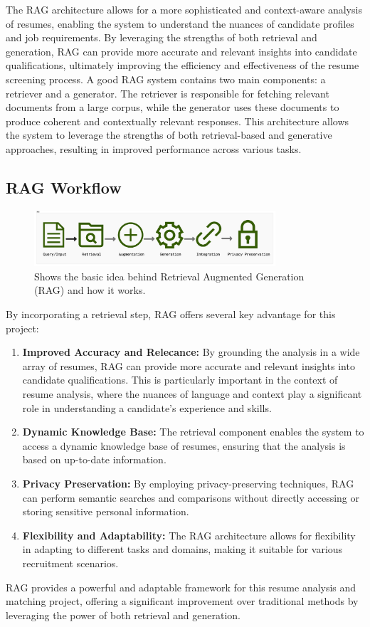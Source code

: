 \documentclass[12pt]{report}
\begin{document}
The RAG architecture allows for a more sophisticated and context-aware analysis of resumes, enabling the system to understand the nuances of candidate profiles and job requirements. By leveraging the strengths of both retrieval and generation, RAG can provide more accurate and relevant insights into candidate qualifications, ultimately improving the efficiency and effectiveness of the resume screening process. A good RAG system contains two main components: a retriever and a generator. The retriever is responsible for fetching relevant documents from a large corpus, while the generator uses these documents to produce coherent and contextually relevant responses. This architecture allows the system to leverage the strengths of both retrieval-based and generative approaches, resulting in improved performance across various tasks. \cite{rothman-2024}

\subsection{RAG Workflow}
\begin{figure}[h]
    \centering
    \includegraphics[width=0.8\textwidth]{images/RAG_Diagrams.png}
    \caption{Shows the basic idea behind Retrieval Augmented Generation (RAG) and how it works.}
    \label{fig:rag_diagram}
\end{figure}

By incorporating a retrieval step, RAG offers several key advantage for this project: 
\begin{enumerate}
    \item \textbf{Improved Accuracy and Relecance:} By grounding the analysis in a wide array of resumes, RAG can provide more accurate and relevant insights into candidate qualifications. This is particularly important in the context of resume analysis, where the nuances of language and context play a significant role in understanding a candidate's experience and skills.
    \item \textbf{Dynamic Knowledge Base:} The retrieval component enables the system to access a dynamic knowledge base of resumes, ensuring that the analysis is based on up-to-date information.
    \item \textbf{Privacy Preservation:} By employing privacy-preserving techniques, RAG can perform semantic searches and comparisons without directly accessing or storing sensitive personal information.
    \item \textbf{Flexibility and Adaptability:} The RAG architecture allows for flexibility in adapting to different tasks and domains, making it suitable for various recruitment scenarios.
\end{enumerate}
RAG provides a powerful and adaptable framework for this resume analysis and matching project, offering a significant improvement over traditional methods by leveraging the power of both retrieval and generation.
\end{document}
